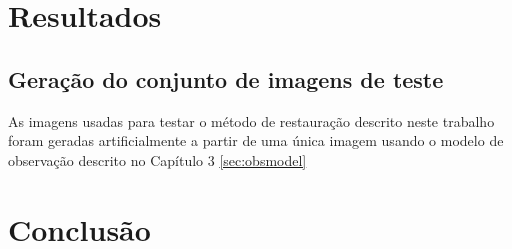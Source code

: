 \documentclass[12pt,openright,oneside,a4paper,english,brazil]{abntex2}
\begin{document}
\chapter{Resultados}
\section{Geração do conjunto de imagens de teste}
As imagens usadas para testar o método de restauração descrito neste trabalho foram geradas artificialmente a partir de uma única imagem usando o modelo de observação descrito no Capítulo 3 \ref{sec:obsmodel}


\chapter{Conclusão}

\postextual



\end{document}
